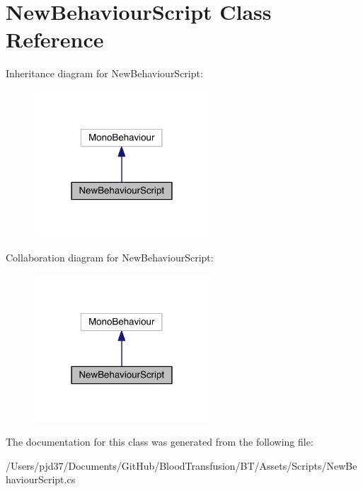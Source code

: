 \hypertarget{class_new_behaviour_script}{}\section{New\+Behaviour\+Script Class Reference}
\label{class_new_behaviour_script}


Inheritance diagram for New\+Behaviour\+Script\+:\nopagebreak
\begin{figure}[H]
\begin{center}
\leavevmode
\includegraphics[width=186pt]{class_new_behaviour_script__inherit__graph}
\end{center}
\end{figure}


Collaboration diagram for New\+Behaviour\+Script\+:\nopagebreak
\begin{figure}[H]
\begin{center}
\leavevmode
\includegraphics[width=186pt]{class_new_behaviour_script__coll__graph}
\end{center}
\end{figure}


The documentation for this class was generated from the following file\+:\begin{DoxyCompactItemize}
\item 
/\+Users/pjd37/\+Documents/\+Git\+Hub/\+Blood\+Transfusion/\+B\+T/\+Assets/\+Scripts/New\+Behaviour\+Script.\+cs\end{DoxyCompactItemize}
